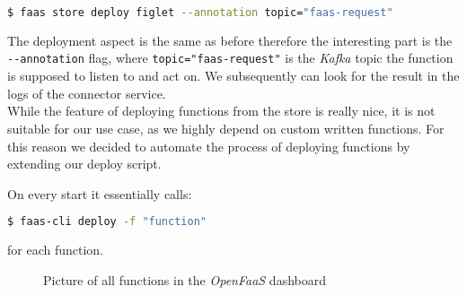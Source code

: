 \begin{lstlisting}[language=bash]
  $ faas store deploy figlet --annotation topic="faas-request"
\end{lstlisting}

The deployment aspect is the same as before therefore the interesting part is the
\texttt{-{}-annotation} flag, where \texttt{topic="faas-request"} is the \textit{Kafka} topic the
function is supposed to listen to and act on. We subsequently can look for the result in the logs of
the connector service. \\
While the feature of deploying functions from the store is really nice, it is not suitable for our
use case, as we highly depend on custom written functions. For this reason we decided to automate
the process of deploying functions by extending our deploy script.

On every start it essentially calls:

\begin{lstlisting}[language=bash]
  $ faas-cli deploy -f "function"
\end{lstlisting}

for each function.

\begin{figure}[H]
  \centering
  \caption{Picture of all functions in the \textit{OpenFaaS} dashboard}
\end{figure}
